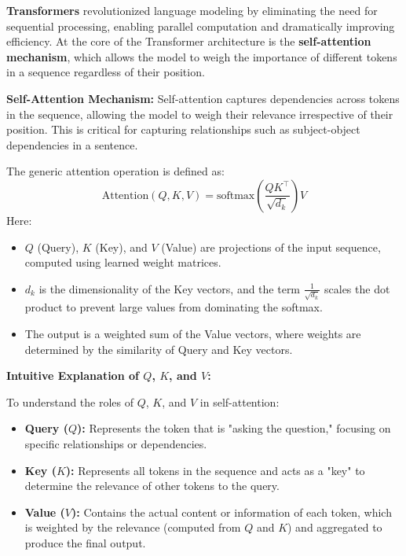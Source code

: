 \begin{flushleft}
    \large \textbf{Transformers} revolutionized language modeling by eliminating the need for sequential processing, enabling parallel computation and dramatically improving efficiency. At the core of the Transformer architecture is the \textbf{self-attention mechanism}, which allows the model to weigh the importance of different tokens in a sequence regardless of their position. \break

    \textbf{Self-Attention Mechanism:}
    Self-attention captures dependencies across tokens in the sequence, allowing the model to weigh their relevance irrespective of their position. This is critical for capturing relationships such as subject-object dependencies in a sentence.

    The generic attention operation is defined as:
    \[
    \text{Attention}(Q, K, V) = \text{softmax}\left(\frac{QK^\top}{\sqrt{d_k}}\right)V
    \]
    Here:
    \begin{itemize}
        \item \(Q\) (Query), \(K\) (Key), and \(V\) (Value) are projections of the input sequence, computed using learned weight matrices.
        \item \(d_k\) is the dimensionality of the Key vectors, and the term \(\frac{1}{\sqrt{d_k}}\) scales the dot product to prevent large values from dominating the softmax.
        \item The output is a weighted sum of the Value vectors, where weights are determined by the similarity of Query and Key vectors.
    \end{itemize}

    \textbf{Intuitive Explanation of \(Q\), \(K\), and \(V\):}

    To understand the roles of \(Q\), \(K\), and \(V\) in self-attention:
    \begin{itemize}
        \item \textbf{Query (\(Q\)):} Represents the token that is "asking the question," focusing on specific relationships or dependencies.
        \item \textbf{Key (\(K\)):} Represents all tokens in the sequence and acts as a "key" to determine the relevance of other tokens to the query.
        \item \textbf{Value (\(V\)):} Contains the actual content or information of each token, which is weighted by the relevance (computed from \(Q\) and \(K\)) and aggregated to produce the final output.
    \end{itemize}


\end{flushleft}
